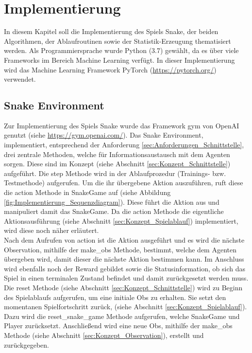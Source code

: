 \chapter{Implementierung} \label{chap:Implementierung}
In diesem Kapitel soll die Implementierung des Spiels Snake, der beiden Algorithmen, der Ablaufroutinen sowie der Statistik-Erzeugung thematisiert werden. Als Programmiersprache wurde Python (3.7) gewählt, da es über viele Frameworks im Bereich Machine Learning verfügt.
In dieser Implementierung wird das Machine Learning Framework PyTorch (\url{https://pytorch.org/}) verwendet.

\section{Snake Environment} \label{sec:Implementierung_Environment}
Zur Implementierung des Spiels Snake wurde das Framework gym von OpenAI genutzt (siehe \url{https://gym.openai.com/}). Das Snake Environment, implementiert, entsprechend der Anforderung \ref{sec:Anforderungen_Schnittstelle}, drei zentrale Methoden, welche für Informationsaustausch mit dem Agenten sorgen. Diese sind im Konzept (siehe Abschnitt \ref{sec:Konzept_Schnittstelle}) aufgeführt. 
Die step Methode wird in der Ablaufprozedur (Trainings- bzw. Testmethode) aufgerufen. Um die ihr übergebene Aktion auszuführen, ruft diese die action Methode in SnakeGame auf (siehe Abbildung \ref{fig:Implementierung_Sequenzdiagram}). Diese führt die Aktion aus und manipuliert damit das SnakeGame. Da die action Methode die eigentliche Aktionsausführung (siehe Abschnitt \ref{sec:Konzept_Spielablauf}) implementiert, wird diese noch näher erläutert.\\
Nach dem Aufrufen von action ist die Aktion ausgeführt und es wird die nächste Observation, mithilfe der make\_obs Methode, bestimmt, welche dem Agenten übergeben wird, damit dieser die nächste Aktion bestimmen kann. Im Anschluss wird ebenfalls noch der Reward gebildet sowie die Statusinformation, ob sich das Spiel in einen terminalen Zustand befindet und damit zurückgesetzt werden muss.\\
Die reset Methode (siehe Abschnitt \ref{sec:Konzept_Schnittstelle}) wird zu Beginn des Spielablaufs aufgerufen, um eine initiale Obs zu erhalten. Sie setzt den momentanen Spielfortschritt zurück, (siehe Abschnitt \ref{sec:Konzept_Spielablauf}). Dazu wird die reset\_snake\_game Methode aufgerufen, welche SnakeGame und Player zurücksetzt. Anschließend wird eine neue Obs, mithilfe der make\_obs Methode (siehe Abschnitt \ref{sec:Konzept_Observation}), erstellt und zurückgegeben.\\
